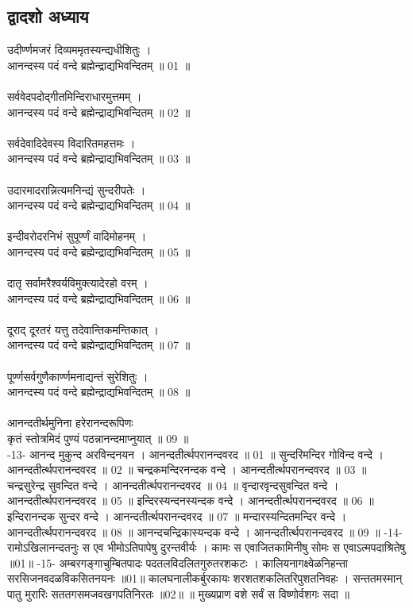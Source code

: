 \subsection{\sanskrit द्वादशो अध्याय}
\sanskrit
उदीर्ण्णमजरं दिव्यममृतस्यन्द्यधीशितुः ।\\
आनन्दस्य पदं वन्दे ब्रह्मेन्द्राद्यभिवन्दितम् ॥ 01 ॥\\
\\
सर्ववेदपदोद्गीतमिन्दिराधारमुत्तमम् ।\\
आनन्दस्य पदं वन्दे ब्रह्मेन्द्राद्यभिवन्दितम् ॥ 02 ॥\\
\\
सर्वदेवादिदेवस्य विदारितमहत्तमः ।\\
आनन्दस्य पदं वन्दे ब्रह्मेन्द्राद्यभिवन्दितम् ॥ 03 ॥\\
\\
उदारमादरान्नित्यमनिन्द्यं सुन्दरीपतेः ।\\
आनन्दस्य पदं वन्दे ब्रह्मेन्द्राद्यभिवन्दितम् ॥ 04 ॥\\
\\
इन्दीवरोदरनिभं सुपूर्ण्णं वादिमोहनम् ।\\
आनन्दस्य पदं वन्दे ब्रह्मेन्द्राद्यभिवन्दितम् ॥ 05 ॥\\
\\
दातृ सर्वामरैश्वर्यविमुक्त्यादेरहो वरम् ।\\
आनन्दस्य पदं वन्दे ब्रह्मेन्द्राद्यभिवन्दितम् ॥ 06 ॥\\
\\
दूराद् दूरतरं यत्तु तदेवान्तिकमन्तिकात् ।\\
आनन्दस्य पदं वन्दे ब्रह्मेन्द्राद्यभिवन्दितम् ॥ 07 ॥\\
\\
पूर्ण्णसर्वगुणैकार्ण्णमनाद्यन्तं सुरेशितुः ।\\
आनन्दस्य पदं वन्दे ब्रह्मेन्द्राद्यभिवन्दितम् ॥ 08 ॥\\
\\
आनन्दतीर्थमुनिना हरेरानन्दरूपिणः\\
कृतं स्तोत्रमिदं पुण्यं पठन्नानन्दमाप्नुयात् ॥ 09 ॥\\
 -13-
आनन्द मुकुन्द अरविन्दनयन । आनन्दतीर्त्थपरानन्दवरद ॥ 01 ॥
सुन्दरिमन्दिर गोविन्द वन्दे । आनन्दतीर्त्थपरानन्दवरद ॥ 02 ॥
चन्द्रकमन्दिरनन्दक वन्दे । आनन्दतीर्त्थपरानन्दवरद ॥ 03 ॥
चन्द्रसुरेन्द्र सुवन्दित वन्दे । आनन्दतीर्त्थपरानन्दवरद ॥ 04 ॥
वृन्दारवृन्दसुवन्दित वन्दे । आनन्दतीर्त्थपरानन्दवरद ॥ 05 ॥
इन्दिरस्यन्दनस्यन्दक वन्दे । आनन्दतीर्त्थपरानन्दवरद ॥ 06 ॥
इन्दिरानन्दक सुन्दर वन्दे । आनन्दतीर्त्थपरानन्दवरद ॥ 07 ॥
मन्दारस्यन्दितमन्दिर वन्दे । आनन्दतीर्त्थपरानन्दवरद ॥ 08 ॥
आनन्दचन्द्रिकास्यन्दक वन्दे । आनन्दतीर्त्थपरानन्दवरद ॥ 09 ॥
-14-
रामोऽखिलानन्दतनुः स एव भीमोऽतिपापेषु दुरन्तवीर्यः ।
कामः स एवाजितकामिनीषु सोमः स एवाऽत्मपदाश्रितेषु ॥01॥
 -15-
अम्बरगङ्गाचुम्बितपादः पदतलविदलितगुरुतरशकटः ।
कालियनागक्ष्वेळनिहन्ता सरसिजनवदळविकसितनयनः ॥01॥
 कालघनालीकर्बुरकायः शरशतशकलितरिपुशतनिवहः ।
सन्ततमस्मान् पातु मुरारिः सततगसमजवखगपतिनिरतः ॥02॥
 ॥ मुख्यप्राण वशे सर्वं स विष्णोर्वशगः सदा ॥

